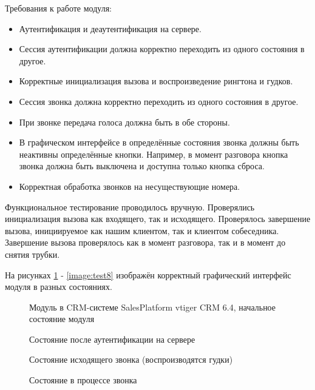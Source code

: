 Требования к работе модуля:
\begin{itemize}
\item Аутентификация и деаутентификация на сервере.
\item Сессия аутентификации должна корректно переходить из одного состояния в другое.
\item Корректные инициализация вызова и воспроизведение рингтона и гудков.
\item Сессия звонка должна корректно переходить из одного состояния в другое.
\item При звонке передача голоса должна быть в обе стороны.
\item В графическом интерфейсе в определённые состояния звонка должны быть неактивны определённые кнопки. Например, в момент разговора кнопка звонка должна быть выключена и доступна только кнопка сброса.
\item Корректная обработка звонков на несуществующие номера.
\end{itemize}

Функциональное тестирование проводилось вручную. Проверялись инициализация вызова как входящего, так и исходящего. Проверялось завершение вызова, инициируемое как нашим клиентом, так и клиентом собеседника. Завершение вызова проверялось как в момент разговора, так и в момент до снятия трубки.

На рисунках \ref{image:test1} - \ref{image:test8} изображён корректный графический интерфейс модуля в разных состояниях.

\begin{figure}[h!]
\caption{Модуль в CRM-системе SalesPlatform vtiger CRM 6.4, начальное состояние модуля}
\label{image:test1}
\end{figure}

\begin{figure}[h!]
\caption{Состояние после аутентификации на сервере}
\label{image:test2}
\end{figure}

\begin{figure}[h!]
\caption{Состояние исходящего звонка (воспроизводятся гудки)}
\label{image:test3}
\end{figure}

\begin{figure}[h!]
\caption{Состояние в процессе звонка}
\label{image:test4}
\end{figure}


